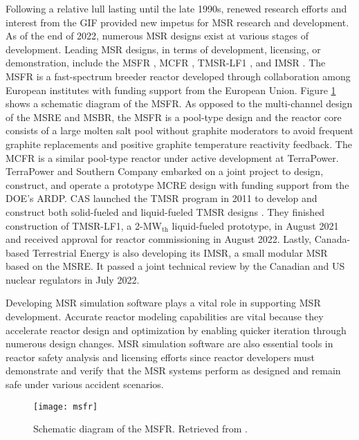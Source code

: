 Following a relative lull lasting until the late 1990s, renewed research efforts and interest from
the \gls{GIF}
provided new impetus for \gls{MSR} research and development. As of the end of 2022, numerous
\gls{MSR} designs exist at various stages of development. Leading \gls{MSR} designs, in terms of
development, licensing, or demonstration, include the \gls{MSFR} \cite{merle_optimized_2007},
\gls{MCFR} \cite{terrapower_terrapower_2021}, TMSR-LF1 \cite{zhang_review_2018}, and \gls{IMSR}
\cite{leblanc_18_2017}. The \gls{MSFR} is a fast-spectrum breeder reactor developed through
collaboration among European institutes with funding support from the
European Union. Figure \ref{fig:msfr} shows a schematic diagram of the \gls{MSFR}. As opposed to
the multi-channel design of the \gls{MSRE} and \gls{MSBR}, the \gls{MSFR} is a pool-type design and
the reactor core consists of a large molten salt pool without graphite moderators to avoid
frequent graphite replacements and positive graphite temperature reactivity feedback. The
\gls{MCFR} is a similar pool-type reactor under active development at TerraPower. TerraPower and
Southern Company embarked on a joint project to design, construct, and operate a prototype
\gls{MCRE} design with funding support from the \gls{DOE}'s \gls{ARDP}. \gls{CAS} launched the
\gls{TMSR} program in 2011 to develop and construct both solid-fueled and liquid-fueled \gls{TMSR}
designs \cite{zou_research_2019}. They finished construction of TMSR-LF1, a 2-MW$_{\text{th}}$
liquid-fueled prototype, in August 2021 and received approval for reactor commissioning in August
2022. Lastly, Canada-based Terrestrial Energy is also developing its \gls{IMSR}, a small modular
\gls{MSR} based on the \gls{MSRE}. It passed a joint technical review by the
Canadian and US nuclear regulators in July 2022.

Developing \gls{MSR} simulation software plays a vital role in supporting \gls{MSR}
development. Accurate reactor modeling capabilities are vital because they
accelerate reactor design and optimization by enabling quicker iteration through numerous design
changes. \gls{MSR} simulation software are also essential tools in reactor safety analysis and
licensing efforts since reactor developers must demonstrate and verify that the \gls{MSR} systems
perform as designed and remain safe under various accident scenarios. 
%
\begin{figure}[htb!]
	\centering
	\texttt{[image: msfr]}
	\caption{Schematic diagram of the \gls{MSFR}. Retrieved from 
	\cite{allibert_7_2016}.}
	\label{fig:msfr}
\end{figure}

